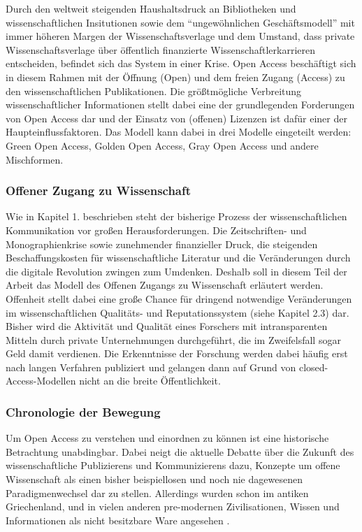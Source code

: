 Durch den weltweit steigenden Haushaltsdruck an Bibliotheken und wissenschaftlichen Insitutionen sowie dem “ungewöhnlichen Geschäftsmodell”\cite{cite:12} mit immer höheren Margen der Wissenschaftsverlage und dem Umstand, dass private Wissenschaftsverlage über öffentlich finanzierte Wissenschaftlerkarrieren entscheiden\cite{cite:13}, befindet sich das System in einer Krise\cite{cite:14}. Open Access beschäftigt sich in diesem Rahmen mit der Öffnung (Open) und dem freien Zugang (Access) zu den wissenschaftlichen Publikationen. Die größtmögliche Verbreitung wissenschaftlicher Informationen stellt dabei eine der grundlegenden Forderungen von Open Access dar\cite{cite:15} und der Einsatz von (offenen) Lizenzen ist dafür einer der Haupteinflussfaktoren\cite{cite:16}. Das Modell kann dabei in drei Modelle eingeteilt werden: Green Open Access, Golden Open Access, Gray Open Access und andere Mischformen.
\subsubsection{Offener Zugang zu Wissenschaft}
Wie in Kapitel 1. beschrieben steht der bisherige Prozess der wissenschaftlichen Kommunikation vor großen Herausforderungen. Die Zeitschriften- und Monographienkrise sowie zunehmender finanzieller Druck, die steigenden Beschaffungskosten für wissenschaftliche Literatur\cite{cite:17} und die Veränderungen durch die digitale Revolution zwingen zum Umdenken. Deshalb soll in diesem Teil der Arbeit das Modell des Offenen Zugangs zu Wissenschaft erläutert werden.
Offenheit stellt dabei eine große Chance für dringend notwendige Veränderungen im wissenschaftlichen Qualitäts- und Reputationssystem (siehe Kapitel 2.3) dar. Bisher wird die Aktivität und Qualität eines Forschers mit intransparenten Mitteln durch private Unternehmungen durchgeführt, die im Zweifelsfall sogar Geld damit verdienen. Die Erkenntnisse der Forschung werden dabei häufig erst nach langen Verfahren publiziert und gelangen dann auf Grund von closed-Access-Modellen nicht an die breite Öffentlichkeit.
\subsubsection{Chronologie der Bewegung}
Um Open Access zu verstehen und einordnen zu können ist eine historische Betrachtung unabdingbar. Dabei neigt die aktuelle Debatte über die Zukunft des wissenschaftliche Publizierens und Kommunizierens dazu, Konzepte um offene Wissenschaft als einen bisher beispiellosen und noch nie dagewesenen Paradigmenwechsel dar zu stellen. Allerdings wurden schon im antiken Griechenland, und in vielen anderen pre-modernen Zivilisationen, Wissen und Informationen als nicht besitzbare Ware angesehen .

